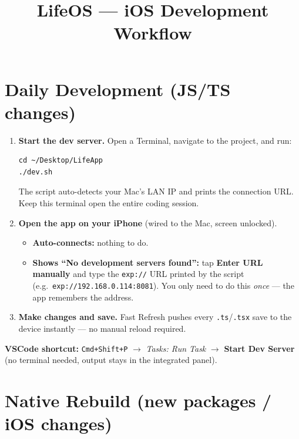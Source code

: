 \documentclass[12pt]{article}
\title{\textbf{LifeOS --- iOS Development Workflow}}
\author{}
\date{}
\begin{document}
\maketitle
\tableofcontents
\newpage

\section{Daily Development (JS/TS changes)}

\begin{enumerate}[leftmargin=*, label=\textbf{Step \arabic*.}]

  \item \textbf{Start the dev server.} Open a Terminal, navigate to the project, and run:
  \begin{lstlisting}
cd ~/Desktop/LifeApp
./dev.sh
  \end{lstlisting}
  The script auto-detects your Mac's LAN IP and prints the connection URL.
  Keep this terminal open the entire coding session.

  \item \textbf{Open the app on your iPhone} (wired to the Mac, screen unlocked).
  \begin{itemize}
    \item \textbf{Auto-connects:} nothing to do.
    \item \textbf{Shows ``No development servers found'':} tap \textbf{Enter URL manually}
      and type the \texttt{exp://} URL printed by the script
      (e.g.\ \texttt{exp://192.168.0.114:8081}).
      You only need to do this \emph{once} --- the app remembers the address.
  \end{itemize}

  \item \textbf{Make changes and save.}
  Fast Refresh pushes every \texttt{.ts}/\texttt{.tsx} save to the device
  instantly --- no manual reload required.

\end{enumerate}

\medskip
\noindent\textbf{VSCode shortcut:} \texttt{Cmd+Shift+P} $\to$
\textit{Tasks: Run Task} $\to$ \textbf{Start Dev Server}
(no terminal needed, output stays in the integrated panel).

\section{Native Rebuild (new packages / iOS changes)}
\end{document}
